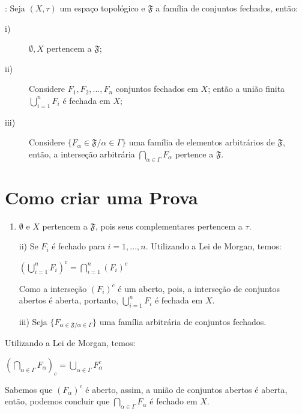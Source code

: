 \begin{teo}: Seja $(X,\tau)$ um espaço topológico e $ \mathfrak{F}$ a
família de conjuntos fechados, então:
\begin{description}
  \item[i)]$\emptyset, X$ pertencem a $ \mathfrak{F}$;
  \item[ii)]Considere $F_{1}, F_{2},..., F_{n}$ conjuntos fechados
  em $X$; então a união finita $\bigcup\limits_{i=1}^{n} F_{i}$ é fechada
  em $X$;
  \item[iii)]Considere $\{ F_{\alpha} \in \mathfrak{F} / \alpha \in
  \Gamma\}$ uma família de elementos arbitrários de $\mathfrak{F}$,
  então, a interseção arbitrária $\bigcap\limits_{\alpha \in \Gamma}F_{\alpha}$ pertence a $\mathfrak{F}.$
\end{description}
\end{teo}

\section{Como criar uma Prova}

 \begin{prova}
 \begin{enumerate}[label=\roman*)]
   \item $\emptyset$ e $X$ pertencem a $\mathfrak{F}$, pois seus
   complementares pertencem a $\tau$.
   \item [ii)] Se $F_{i}$ é fechado para $i = 1,...,n$. Utilizando a Lei de Morgan, temos:
   \begin{center}
   $(\bigcup\limits_{i=1}^{n} F_{i})^{c} = \bigcap\limits_{i=1}^{n} (F_{i})^{c}$
   \end{center}
   Como a interseção $(F_{i})^{c}$ é  um aberto, pois, a interseção
   de conjuntos abertos é aberta, portanto, $\bigcup\limits_{i=1}^{n} F_{i}$ é fechada
   em $X.$
   \item [iii)] Seja $\{F_{\alpha \in \mathfrak{F} / \alpha \in
   \Gamma}\}$ uma família arbitrária de conjuntos fechados.
   \end{enumerate}
   Utilizando a Lei de Morgan, temos:
   \begin{center}
   $(\bigcap_{\alpha \in \Gamma} F_{\alpha})_{c} = \bigcup\limits_{\alpha \in
   \Gamma} F_{\alpha}^{c}$
   \end{center}
   Sabemos que $(F_{\alpha})^{c}$ é aberto, assim, a união de
   conjuntos abertos é aberta, então, podemos concluir que $\bigcap\limits_{\alpha \in
   \Gamma}F_{\alpha}$ é fechado em $X$.
 \end{prova}
